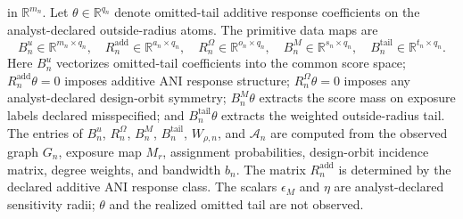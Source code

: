 \documentclass[11pt]{article}
\newcommand{\R}{\mathbb{R}}
\theoremstyle{definition}
\theoremstyle{plain}
\theoremstyle{remark}
\begin{document}
in \(\R^{m_n}\).  Let \(\theta\in\R^{q_n}\) denote omitted-tail additive
response coefficients on the analyst-declared outside-radius atoms.  The
primitive data maps are
\[
  B^u_n\in\R^{m_n\times q_n},\quad
  R^{\mathrm{add}}_n\in\R^{a_n\times q_n},\quad
  R^{\Omega}_n\in\R^{o_n\times q_n},\quad
  B^{M}_n\in\R^{s_n\times q_n},\quad
  B^{\mathrm{tail}}_n\in\R^{t_n\times q_n}.
\]
Here \(B^u_n\) vectorizes omitted-tail coefficients into the common score
space; \(R^{\mathrm{add}}_n\theta=0\) imposes additive ANI response structure;
\(R^\Omega_n\theta=0\) imposes any analyst-declared design-orbit symmetry;
\(B^M_n\theta\) extracts the score mass on exposure labels declared
misspecified; and \(B^{\mathrm{tail}}_n\theta\) extracts the weighted
outside-radius tail.  The entries of \(B^u_n\), \(R^\Omega_n\), \(B^M_n\),
\(B^{\mathrm{tail}}_n\), \(W_{\rho,n}\), and \(\mathcal A_n\) are computed
from the observed graph \(G_n\), exposure map \(M_r\), assignment
probabilities, design-orbit incidence matrix, degree weights, and bandwidth
\(b_n\).  The matrix \(R^{\mathrm{add}}_n\) is determined by the declared
additive ANI response class.  The scalars \(\epsilon_M\) and \(\eta\) are
analyst-declared sensitivity radii; \(\theta\) and the realized omitted tail
are not observed.
\end{document}
